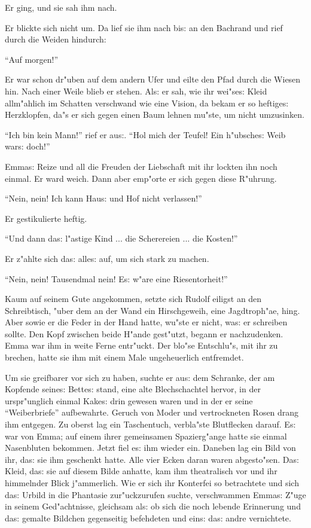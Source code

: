 \documentclass[oneside,12pt]{book}
\newcommand{\s}{s:}%
\begin{document}
Er ging, und sie sah ihm nach.

Er blickte sich nicht um. Da lief sie ihm nach bi{\s} an den
Bachrand und rief durch die Weiden hindurch:

"`Auf morgen!"'

Er war schon dr"uben auf dem andern Ufer und eilte den Pfad durch
die Wiesen hin. Nach einer Weile blieb er stehen. Al{\s} er sah,
wie ihr wei"se{\s} Kleid allm"ahlich im Schatten verschwand wie
eine Vision, da bekam er so heftige{\s} Herzklopfen, da"s er sich
gegen einen Baum lehnen mu"ste, um nicht umzusinken.

"`Ich bin kein Mann!"' rief er au{\s}. "`Hol mich der Teufel! Ein
h"ubsche{\s} Weib war{\s} doch!"'

Emma{\s} Reize und all die Freuden der Liebschaft mit ihr lockten
ihn noch einmal. Er ward weich. Dann aber emp"orte er sich gegen
diese R"uhrung.

"`Nein, nein! Ich kann Hau{\s} und Hof nicht verlassen!"'

Er gestikulierte heftig.

"`Und dann da{\s} l"astige Kind ... die Scherereien ... die
Kosten!"'

Er z"ahlte sich da{\s} alle{\s} auf, um sich stark zu machen.

"`Nein, nein! Tausendmal nein! E{\s} w"are eine Riesentorheit!"'


\newpage\begin{center}
{\large \so{Dreizehnte{\s} Kapitel}}\bigskip\bigskip
\end{center}

Kaum auf seinem Gute angekommen, setzte sich Rudolf eiligst an den
Schreibtisch, "uber dem an der Wand ein Hirschgeweih, eine
Jagdtroph"ae, hing. Aber sowie er die Feder in der Hand hatte,
wu"ste er nicht, wa{\s} er schreiben sollte. Den Kopf zwischen
beide H"ande gest"utzt, begann er nachzudenken. Emma war ihm in
weite Ferne entr"uckt. Der blo"se Entschlu"s, mit ihr zu brechen,
hatte sie ihm mit einem Male ungeheuerlich entfremdet.

Um sie greifbarer vor sich zu haben, suchte er au{\s} dem
Schranke, der am Kopfende seine{\s} Bette{\s} stand, eine alte
Blechschachtel hervor, in der urspr"unglich einmal Kake{\s} drin
gewesen waren und in der er seine "`Weiberbriefe"' aufbewahrte.
Geruch von Moder und vertrockneten Rosen drang ihm entgegen. Zu
oberst lag ein Taschentuch, verbla"ste Blutflecken darauf. E{\s}
war von Emma; auf einem ihrer gemeinsamen Spazierg"ange hatte sie
einmal Nasenbluten bekommen. Jetzt fiel e{\s} ihm wieder ein.
Daneben lag ein Bild von ihr, da{\s} sie ihm geschenkt hatte. Alle
vier Ecken daran waren abgesto"sen. Da{\s} Kleid, da{\s} sie auf
diesem Bilde anhatte, kam ihm theatralisch vor und ihr himmelnder
Blick j"ammerlich. Wie er sich ihr Konterfei so betrachtete und
sich da{\s} Urbild in die Phantasie zur"uckzurufen suchte,
verschwammen Emma{\s} Z"uge in seinem Ged"achtnisse, gleichsam
al{\s} ob sich die noch lebende Erinnerung und da{\s} gemalte
Bildchen gegenseitig befehdeten und ein{\s} da{\s} andre
vernichtete.
\end{document}
